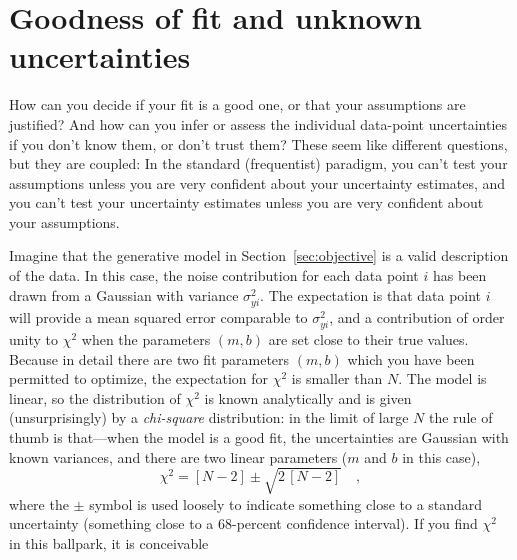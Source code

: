 \documentclass[12pt,twoside,pdftex]{article}
\newcommand{\sectionname}{Section}
\begin{document}
\section{Goodness of fit and unknown uncertainties}\label{sec:goodness}

How can you decide if your fit is a good one, or that your assumptions
are justified?  And how can you infer or assess the individual
data-point uncertainties if you don't know them, or don't trust them?
These seem like different questions, but they are coupled: In the
standard (frequentist) paradigm, you can't test your assumptions
unless you are very confident about your uncertainty estimates, and
you can't test your uncertainty estimates unless you are very
confident about your assumptions.

Imagine that the generative model in \sectionname~\ref{sec:objective}
is a valid description of the data.  In this case, the noise
contribution for each data point $i$ has been drawn from a Gaussian
with variance $\sigma_{yi}^2$.  The expectation is that data point $i$
will provide a mean squared error comparable to $\sigma_{yi}^2$, and a
contribution of order unity to $\chi^2$ when the parameters $(m,b)$
are set close to their true values.  Because in detail there are two
fit parameters $(m,b)$ which you have been permitted to optimize, the
expectation for $\chi^2$ is smaller than $N$. The model is linear, so
the distribution of $\chi^2$ is known analytically and is given
(unsurprisingly) by a \emph{chi-square} distribution: in the limit of
large $N$ the rule of thumb is that---when the model is a good fit,
the uncertainties are Gaussian with known variances, and there are two
linear parameters ($m$ and $b$ in this case),
\begin{equation}
\chi^2 = [N-2] \pm \sqrt{2\,[N-2]} \quad ,
\end{equation}
where the $\pm$ symbol is used loosely to indicate something close to
a standard uncertainty (something close to a 68-percent confidence
interval).  If you find $\chi^2$ in this ballpark, it is conceivable
\end{document}
